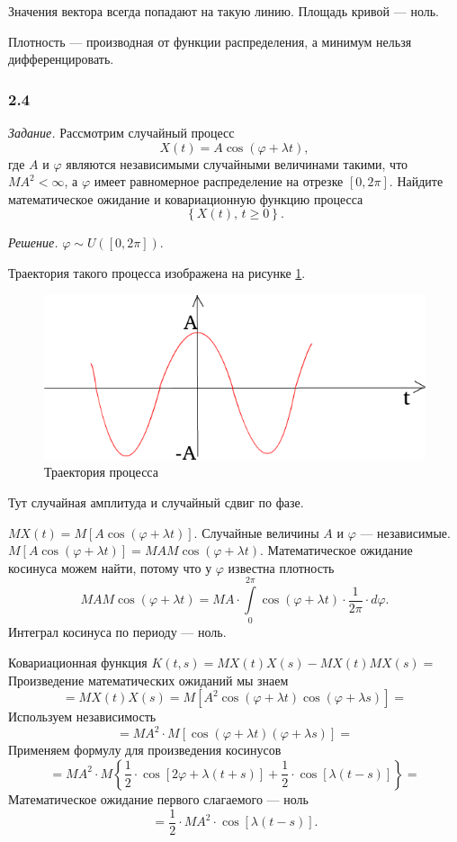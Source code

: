Значения вектора всегда попадают на такую линию.
Площадь кривой --- ноль.

Плотность --- производная от функции распределения, а минимум нельзя дифференцировать.

\subsubsection*{2.4}

\textit{Задание.}
Рассмотрим случайный процесс
$$X \left( t \right) =
  A \cos \left( \varphi + \lambda t \right),$$
где $A$ и $ \varphi $ являются независимыми случайными величинами такими, что $MA^2 < \infty $,
а $ \varphi $ имеет равномерное распределение на отрезке $ \left[ 0, 2 \pi \right] $.
Найдите математическое ожидание и ковариационную функцию процесса
$$ \left\{ X \left( t \right), \, t \geq 0 \right\}.$$

\textit{Решение.} $ \varphi \sim U \left( \left[ 0, 2 \pi \right] \right) $.

Траектория такого процесса изображена на рисунке \ref{fig:24}.

\begin{figure}[h!]
 \centering
 \includegraphics[width=.5\textwidth]{./pictures/2_4.png}
 \caption{Траектория процесса}
 \label{fig:24}
\end{figure}

Тут случайная амплитуда и случайный сдвиг по фазе.

$MX \left( t \right) =
M \left[ A \cos \left( \varphi + \lambda t \right) \right] $.
Случайные величины $A$ и $ \varphi $ --- независимые.
$M \left[ A \cos \left( \varphi + \lambda t \right) \right] =
  MAM \cos \left( \varphi + \lambda t \right) $.
Математическое ожидание косинуса можем найти, потому что у $ \varphi $ известна плотность
$$MAM \cos \left( \varphi + \lambda t \right) =
  MA \cdot \int \limits_0^{2 \pi }
    \cos \left( \varphi + \lambda t \right) \cdot \frac{1}{2 \pi } \cdot d \varphi.$$
Интеграл косинуса по периоду --- ноль.

Ковариационная функция
$K \left( t, s \right) =
  MX \left( t \right) X \left( s \right) - MX \left( t \right) MX \left( s \right) =$
Произведение математических ожиданий мы знаем
$$= MX \left( t \right) X \left( s \right) =
  M \left[
    A^2 \cos \left( \varphi + \lambda t \right) \cos \left( \varphi + \lambda s \right) \right] =$$
Используем независимость
$$= MA^2 \cdot
  M \left[ \cos \left( \varphi + \lambda t \right) \left( \varphi + \lambda s \right) \right] =$$
Применяем формулу для произведения косинусов
$$= MA^2 \cdot M \left\{
    \frac{1}{2} \cdot \cos \left[ 2 \varphi + \lambda \left( t + s \right) \right] +
    \frac{1}{2} \cdot \cos \left[ \lambda \left( t - s \right) \right] \right\} =$$
Математическое ожидание первого слагаемого --- ноль
$$= \frac{1}{2} \cdot MA^2 \cdot \cos \left[ \lambda \left( t - s \right) \right].$$

